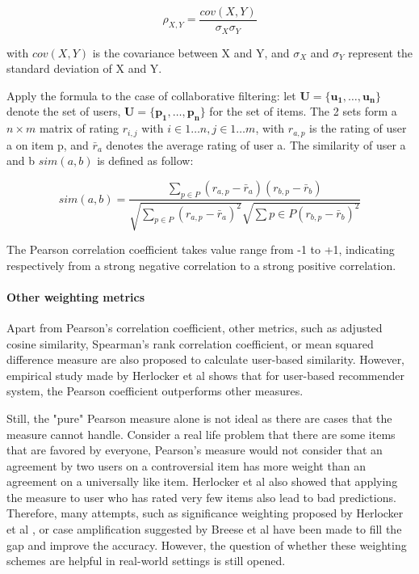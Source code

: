 \begin{displaymath}
\rho_{X,Y} = \frac{cov(X,Y)}{\sigma_X \sigma_Y}
\end{displaymath}

with \(cov(X,Y)\) is the covariance between X and Y, and \(\sigma_X\) and \(\sigma_Y\) represent the standard deviation of X and Y. 

Apply the formula to the case of collaborative filtering: let \( \mathbf{U} = \{ \mathbf{u_1}, \dots, \mathbf{u_n}\} \) denote the set of users, \( \mathbf{U} = \{ \mathbf{p_1}, \dots, \mathbf{p_n} \} \) for the set of items. The 2 sets form a \(n \times m\) matrix of rating \(r_{i,j}\) with \(i \in 1 \dots n, j \in 1 \dots m\), with \(r_{a,p} \) is the rating of user a on item p, and \(\bar{r}_a \) denotes the average rating of user a. The similarity of user a and b \(sim(a, b) \) is defined as follow:

\begin{displaymath}
sim(a,b) = \frac{\sum_{p \in P}(r_{a,p} - \bar{r}_a)(r_{b,p} - \bar{r}_b)}{\sqrt{\sum_{p \in P}(r_{a,p} - \bar{r}_a)^2} \sqrt{\sum{p \in P}(r_{b,p} - \bar{r}_b)^2}}
\end{displaymath}

The Pearson correlation coefficient takes value range from -1 to +1, indicating respectively from a strong negative correlation to a strong positive correlation.

\paragraph{Other weighting metrics}
Apart from Pearson's correlation coefficient, other metrics, such as adjusted cosine similarity, Spearman's rank correlation coefficient, or mean squared difference measure are also proposed to calculate user-based similarity. However, empirical study made by Herlocker et al \cite{herlocker1999algorithmic} shows that for user-based recommender system, the Pearson coefficient outperforms other measures.

Still, the "pure" Pearson measure alone is not ideal as there are cases that the measure cannot handle. Consider a real life problem that there are some items that are favored by everyone, Pearson's measure would not consider that an agreement by two users on a controversial item has more weight than an agreement on a universally like item. Herlocker et al \cite{herlocker1999algorithmic} also showed that applying the measure to user who has rated very few items also lead to bad predictions. Therefore, many attempts, such as significance weighting proposed by Herlocker et al \cite{herlocker1999algorithmic}, or case amplification suggested by Breese et al \cite{breese1998empirical} have been made to fill the gap and improve the accuracy. However, the question of whether these weighting schemes are helpful in real-world settings is still opened.

